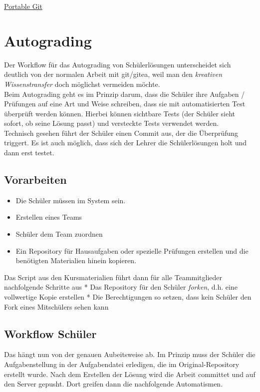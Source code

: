 \documentclass[
  letterpaper,
  DIV=11]{scrreprt}
\providecommand{\tightlist}{%
  \setlength{\itemsep}{0pt}\setlength{\parskip}{0pt}}\usepackage{longtable,booktabs,array}
\begin{document}
\href{https://git-scm.com/downloads/win}{Portable Git}


\chapter{Autograding}\label{autograding}

Der Workflow für das Autograding von Schülerlösungen unterscheidet sich
deutlich von der normalen Arbeit mit git/gitea, weil man den
\emph{kreativen Wissenstransfer} doch möglichst vermeiden möchte.\\
Beim Autograding geht es im Prinzip darum, dass die Schüler ihre
Aufgaben / Prüfungen auf eine Art und Weise schreiben, dass sie mit
automatisierten Test überprüft werden können. Hierbei können sichtbare
Tests (der Schüler sieht sofort, ob seine Lösung passt) und versteckte
Tests verwendet werden.\\
Technisch gesehen führt der Schüler einen Commit aus, der die
Überprüfung triggert. Es ist auch möglich, dass sich der Lehrer die
Schülerlösungen holt und dann erst testet.

\section{Vorarbeiten}\label{vorarbeiten}

\begin{itemize}
\tightlist
\item
  Die Schüler müssen im System sein.
\item
  Erstellen eines Teams
\item
  Schüler dem Team zuordnen
\item
  Ein Repository für Hausaufgaben oder spezielle Prüfungen erstellen und
  die benötigten Materialien hinein kopieren.
\end{itemize}

Das Script aus den Kursmaterialien führt dann für alle Teammitglieder
nachfolgende Schritte aus * Das Repository für den Schüler
\emph{forken}, d.h. eine vollwertige Kopie erstellen * Die
Berechtigungen so setzen, dass kein Schüler den Fork eines Mitschülers
sehen kann

\section{Workflow Schüler}\label{workflow-schuxfcler}

Das hängt nun von der genauen Aubeitsweise ab. Im Prinzip muss der
Schüler die Aufgabenstellung in der Aufgabendatei erledigen, die im
Original-Repository erstellt wurde. Nach dem Erstellen der Lösung wird
die Arbeit committet und auf den Server gepusht. Dort greifen dann die
nachfolgende Automatismen.
\end{document}
